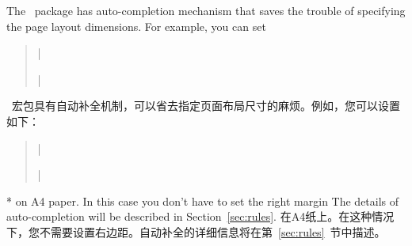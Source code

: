 \begin{paracol}{2}
The \Gm\ package has auto-completion mechanism that saves the
trouble of specifying the page layout dimensions. For example,
you can set
\begin{quote}
    |\usepackage[width=14cm, left=3cm]{geometry}|
\end{quote}
\switchcolumn
\Gm\ 宏包具有自动补全机制，可以省去指定页面布局尺寸的麻烦。例如，您可以设置如下：
\begin{quote}
|\usepackage[width=14cm, left=3cm]{geometry}|
\end{quote}

\switchcolumn[0]*
on A4 paper. In this case you don't have to set the right margin
The details of auto-completion will be described in
Section~\ref{sec:rules}.
\switchcolumn
在A4纸上。在这种情况下，您不需要设置右边距。自动补全的详细信息将在第~\ref{sec:rules}~节中描述。
\end{paracol}

